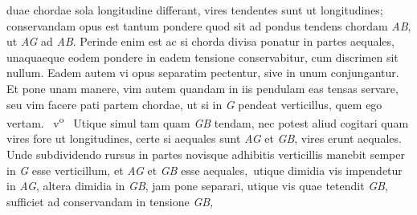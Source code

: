 duae chordae\protect{}
sola longitudine differant,
vires tendentes\protect{}
sunt ut longitudines;\protect{}
conservandam opus est tantum pondere\protect{}
quod sit ad pondus tendens chordam \textit{AB},
ut \textit{AG} ad \textit{AB}.
Perinde enim est ac si chorda divisa ponatur in partes aequales,
unaquaeque eodem pondere\protect{}
in eadem tensione\protect{} conservabitur,
cum discrimen sit nullum.
Eadem autem vi opus
separatim pectentur,
sive in unum conjungantur.
Et pone unam manere,
vim autem quandam in iis pendulam eas tensas servare,
seu vim\protect{}
facere pati partem chordae,
ut si in \textit{G} pendeat verticillus,\protect{}
quem ego vertam.
%
~v\textsuperscript{o}\rbrack\ %
%
Utique simul tam 
 quam \textit{GB} tendam,
nec potest aliud cogitari quam vires
fore ut longitudines,\protect{}
certe si aequales sunt \textit{AG} et \textit{GB},
vires\protect{} erunt aequales.
Unde subdividendo rursus in partes
novisque adhibitis verticillis\protect{}
manebit semper
in \textit{G} esse verticillum,\protect{}
et \textit{AG} et \textit{GB} esse aequales\lbrack,\rbrack\
utique dimidia vis impendetur in \textit{AG},
altera dimidia in \textit{GB},
jam pone separari,
utique vis quae tetendit\protect{} \textit{GB},
sufficiet ad conservandam in tensione\protect{} \textit{GB,}
